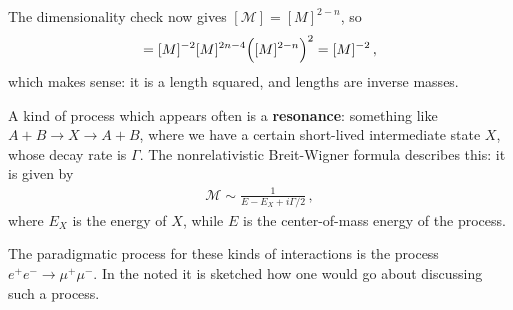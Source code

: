 \documentclass[main.tex]{subfiles}
\begin{document}
The dimensionality check now gives \([\mathcal{M}] = [M]^{2-n}\), so 
%
\begin{align}
[\sigma ] = [M]^{-2} [M]^{2n-4} \qty([M]^{2-n})^2 = [M]^{-2}
\,,
\end{align}
%
which makes sense: it is a length squared, and lengths are inverse masses.

A kind of process which appears often is a \textbf{resonance}: something like \(A+B \to X \to A+B\), where we have a certain short-lived intermediate state \(X\), whose decay rate is \(\Gamma \).
The nonrelativistic Breit-Wigner formula describes this: it is given by 
%
\begin{align}
\mathcal{M} \sim \frac{1}{E - E_X + i \Gamma/ 2}  
\,,
\end{align}
%
where \(E_X\) is the energy of \(X\), while \(E\) is the center-of-mass energy of the process. 

The paradigmatic process for these kinds of interactions is the process \(e^{+}e^{-} \to \mu^{+}\mu^- \). 
In the noted it is sketched how one would go about discussing such a process. 
\end{document}

